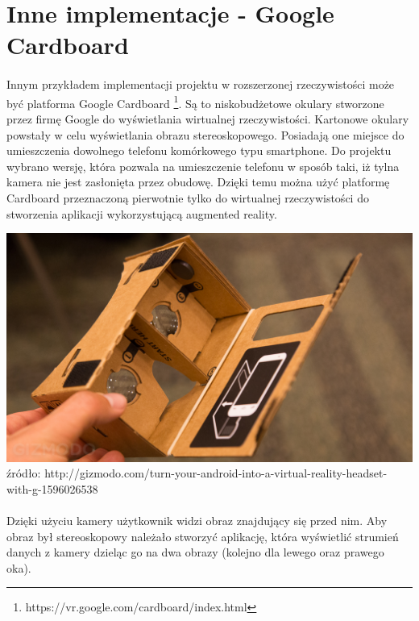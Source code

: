 \newpage
\section{Inne implementacje - Google Cardboard}
\paragraph{}
Innym przykładem implementacji projektu w rozszerzonej rzeczywistości może być platforma Google Cardboard \footnote{https://vr.google.com/cardboard/index.html}. Są to niskobudżetowe okulary stworzone przez firmę Google do wyświetlania wirtualnej rzeczywistości. Kartonowe okulary powstały w celu wyświetlania obrazu stereoskopowego. Posiadają one miejsce do umieszczenia dowolnego telefonu komórkowego typu smartphone. Do projektu wybrano wersję, która pozwala na umieszczenie telefonu w sposób taki, iż tylna kamera nie jest zasłonięta przez obudowę. Dzięki temu można użyć platformę Cardboard przeznaczoną pierwotnie tylko do wirtualnej rzeczywistości do stworzenia aplikacji wykorzystującą augmented reality.

\begin{center}
\includegraphics[width=1\textwidth]{images/cardboard.jpg}
\small {źródło: http://gizmodo.com/turn-your-android-into-a-virtual-reality-headset-with-g-1596026538 }
\end{center}

\paragraph{}
Dzięki użyciu kamery użytkownik widzi obraz znajdujący się przed nim. Aby obraz był stereoskopowy należało stworzyć aplikację, która wyświetlić strumień danych z kamery dzieląc go na dwa obrazy (kolejno dla lewego oraz prawego oka).

